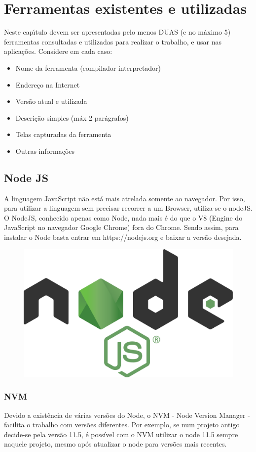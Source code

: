

\chapter{Ferramentas existentes e utilizadas}

Neste cap\'{\i}tulo devem ser apresentadas pelo menos DUAS (e no m\'{a}ximo 5) ferramentas consultadas e utilizadas para realizar o trabalho, e usar nas aplica\c{c}\~{o}es. Considere em cada caso:
\begin{itemize}
  \item Nome da ferramenta (compilador-interpretador)
  \item Endere\c{c}o na Internet
  \item Vers\~{a}o atual e utilizada
  \item Descri\c{c}\~{a}o simples (m\'{a}x 2 par\'{a}grafos)
  \item Telas capturadas da ferramenta
  \item Outras informa\c{c}\~{o}es
\end{itemize}

    \section{Node JS}
    A linguagem JavaScript não está mais atrelada somente ao navegador. Por isso, para utilizar a linguagem sem precisar recorrer a um Browser, utiliza-se o nodeJS. O NodeJS, conhecido apenas como Node, nada mais é do que o V8 (Engine do JavaScript no navegador Google Chrome) fora do Chrome. Sendo assim, para instalar o Node basta entrar em https://nodejs.org e baixar a versão desejada. 
    
\begin{figure}[h]
	\centering
	\includegraphics[width=0.3\linewidth]{Pictures/NodeLogo}
	\caption{}
	\label{fig:nodelogo}
\end{figure}
    
    \subsection{NVM}
    Devido a existência de várias versões do Node, o NVM - Node Version Manager - facilita o trabalho com versões diferentes. Por exemplo, se num projeto antigo decide-se pela versão 11.5, é possível com o NVM utilizar o node 11.5 sempre naquele projeto, mesmo após atualizar o node para versões mais recentes.


